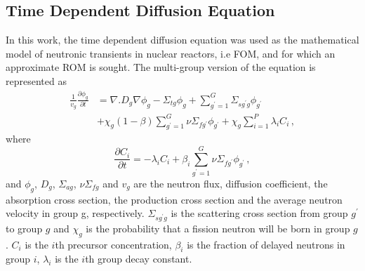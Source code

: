 \documentclass[]{interact}
\theoremstyle{plain}%
\theoremstyle{definition}
\theoremstyle{remark}
\begin{document}
\subsection{Time Dependent Diffusion Equation}
\label{sec:fom}
In this work, the time dependent diffusion equation was used as the mathematical model of neutronic transients in nuclear reactors, i.e FOM, and for which an approximate ROM is sought.
The multi-group version of the equation is represented as
\begin{equation}
	\begin{split}
	\frac{1}{v_g} \frac{\partial\phi_g}{\partial t} &= 
	\nabla. D_g\nabla\phi_g - \Sigma_{tg}\phi_g + \sum_{g^\prime=1}^{G}{\Sigma_{sg^\prime g}}\phi_{g^\prime} \\
	&+ \chi_g(1-\beta)\sum_{g^\prime = 1}^{G}\nu\Sigma_{fg^\prime}\phi_{g^\prime}  
	+ \chi_g\sum_{i=1}^{P} \lambda_i C_i \, ,
	\end{split}
	\label{time_diff}
\end{equation}
where 
\begin{equation*}
	\frac{\partial C_i}{\partial t} = -\lambda_i C_i + \beta_i \sum_{g^\prime=1}^{G} \nu\Sigma_{fg^\prime} \phi_{g^\prime} \, ,
\end{equation*}
and $\phi_g$, $D_g$, $\Sigma_{ag}$, $\nu\Sigma_{fg}$ and $v_g$ are the neutron flux, diffusion coefficient, the absorption cross section, the production cross section and the average neutron velocity in group g, respectively. $\Sigma_{sg^\prime g}$ is the scattering cross section from group $g^\prime$ to group $g$ 
and $\chi_g$ is the probability that a fission neutron will be born in group $g$.
$C_i$ is the $i$th precursor concentration, $\beta_i$ is the fraction of delayed neutrons in group $i$, $\lambda_i$ is the $i$th group decay constant.
\end{document}

